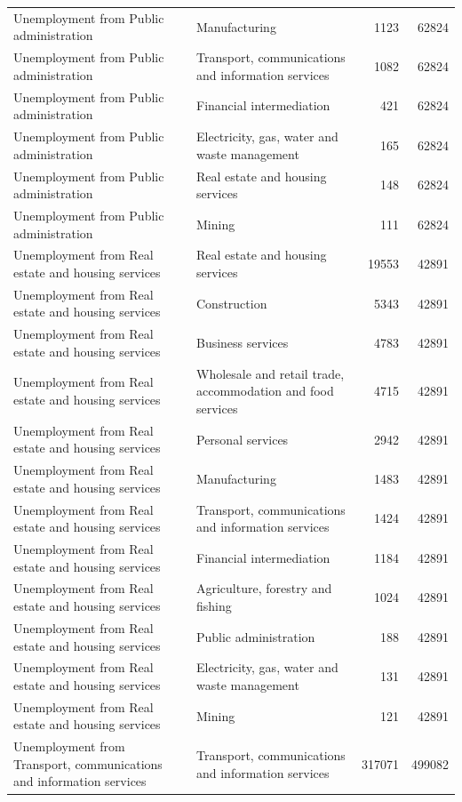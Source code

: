 \begin{longtable}{llrr}
Unemployment from Public administration & Manufacturing & 1123 & 62824 \\
Unemployment from Public administration & Transport, communications and information services & 1082 & 62824 \\
Unemployment from Public administration & Financial intermediation & 421 & 62824 \\
Unemployment from Public administration & Electricity, gas, water and waste management & 165 & 62824 \\
Unemployment from Public administration & Real estate and housing services & 148 & 62824 \\
Unemployment from Public administration & Mining & 111 & 62824 \\
Unemployment from Real estate and housing services & Real estate and housing services & 19553 & 42891 \\
Unemployment from Real estate and housing services & Construction & 5343 & 42891 \\
Unemployment from Real estate and housing services & Business services & 4783 & 42891 \\
Unemployment from Real estate and housing services & Wholesale and retail trade, accommodation and food services & 4715 & 42891 \\
Unemployment from Real estate and housing services & Personal services & 2942 & 42891 \\
Unemployment from Real estate and housing services & Manufacturing & 1483 & 42891 \\
Unemployment from Real estate and housing services & Transport, communications and information services & 1424 & 42891 \\
Unemployment from Real estate and housing services & Financial intermediation & 1184 & 42891 \\
Unemployment from Real estate and housing services & Agriculture, forestry and fishing & 1024 & 42891 \\
Unemployment from Real estate and housing services & Public administration & 188 & 42891 \\
Unemployment from Real estate and housing services & Electricity, gas, water and waste management & 131 & 42891 \\
Unemployment from Real estate and housing services & Mining & 121 & 42891 \\
Unemployment from Transport, communications and information services & Transport, communications and information services & 317071 & 499082 \\

\end{longtable}
